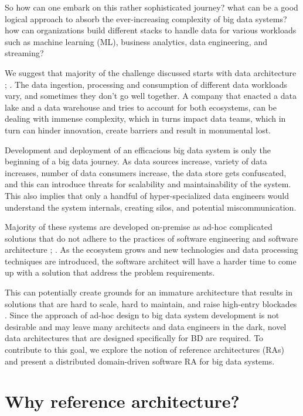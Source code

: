 \documentclass[review]{elsarticle}
\begin{document}
So how can one embark on this rather sophisticated journey? what can be a good logical approach to absorb the ever-increasing complexity of big data systems? how can organizations build different stacks to handle data for various workloads such as machine learning (ML), business analytics, data engineering, and streaming? 

We suggest that majority of the challenge discussed starts with data architecture \cite{AtaeiACIS}; \cite{AtaeiApsec}. The data ingestion, processing and consumption of different data workloads vary, and sometimes they don't go well together. A company that enacted a data lake and a data warehouse and tries to account for both ecosystems, can be dealing with immense complexity, which in turns impact data teams, which in turn can hinder innovation, create barriers and result in monumental  lost.

Development and deployment of an efficacious big data system is only the beginning of a big data journey. As data sources increase, variety of data increases, number of data consumers increase, the data store gets confuscated, and this can introduce threats for scalability and maintainability of the system. This also implies that only a handful of hyper-specialized data engineers would understand the system internals, creating silos, and potential miscommunication. 

Majority of these systems are developed on-premise as ad-hoc complicated solutions that do not adhere to the practices of software engineering and software architecture \cite{Gorton}; \cite{Nadal}. As the ecosystem grows and new technologies and data processing techniques are introduced, the software architect will have a harder time to come up with a solution that address the problem requirements. 

This can potentially create grounds for an immature architecture that results in solutions that are hard to scale, hard to maintain, and raise high-entry blockades \cite{AtaeiApsec}. Since the approach of ad-hoc design to big data system development is not desirable and may leave many architects and data engineers in the dark, novel data architectures that are designed specifically for BD are required. To contribute to this goal, we explore the notion of reference architectures (RAs) and present a distributed domain-driven software RA for big data systems.


\section{Why reference architecture?}
\end{document}
